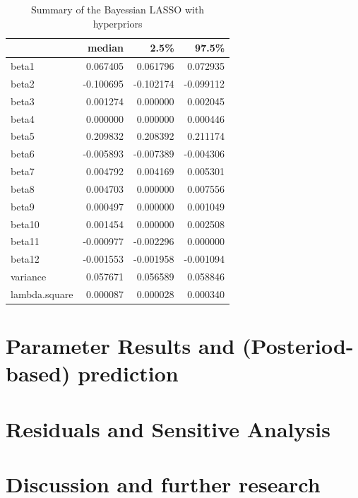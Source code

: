 \documentclass[12pt,a4paper]{article}
\begin{document}
\begin{table}

\caption{\label{tab:unnamed-chunk-7}\label{tab:sum_bay_hy} Summary of the  Bayessian LASSO with hyperpriors}
\centering
\begin{tabular}[t]{lrrr}
\toprule
  & median & 2.5\% & 97.5\%\\
\midrule
\rowcolor{gray!6}  beta1 & 0.067405 & 0.061796 & 0.072935\\
beta2 & -0.100695 & -0.102174 & -0.099112\\
\rowcolor{gray!6}  beta3 & 0.001274 & 0.000000 & 0.002045\\
beta4 & 0.000000 & 0.000000 & 0.000446\\
\rowcolor{gray!6}  beta5 & 0.209832 & 0.208392 & 0.211174\\
beta6 & -0.005893 & -0.007389 & -0.004306\\
\rowcolor{gray!6}  beta7 & 0.004792 & 0.004169 & 0.005301\\
beta8 & 0.004703 & 0.000000 & 0.007556\\
\rowcolor{gray!6}  beta9 & 0.000497 & 0.000000 & 0.001049\\
beta10 & 0.001454 & 0.000000 & 0.002508\\
\rowcolor{gray!6}  beta11 & -0.000977 & -0.002296 & 0.000000\\
beta12 & -0.001553 & -0.001958 & -0.001094\\
\rowcolor{gray!6}  variance & 0.057671 & 0.056589 & 0.058846\\
lambda.square & 0.000087 & 0.000028 & 0.000340\\
\bottomrule
\end{tabular}
\end{table}

\hypertarget{parameter-results-and-posteriod-based-prediction}{%
\section{Parameter Results and (Posteriod-based)
prediction}\label{parameter-results-and-posteriod-based-prediction}}

\hypertarget{residuals-and-sensitive-analysis}{%
\section{Residuals and Sensitive
Analysis}\label{residuals-and-sensitive-analysis}}

\hypertarget{discussion-and-further-research}{%
\section{Discussion and further
research}\label{discussion-and-further-research}}
\end{document}
